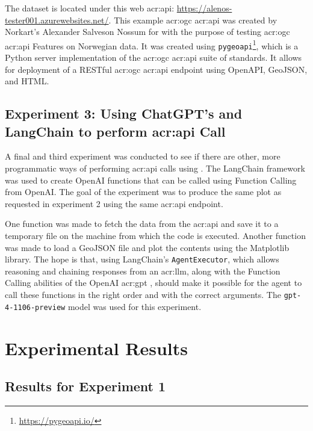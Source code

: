 The dataset is located under this web \acrshort{acr:api}: \url{https://alenos-tester001.azurewebsites.net/}. This example \acrshort{acr:ogc} \acrshort{acr:api} was created by Norkart's Alexander Salveson Nossum for with the purpose of testing \acrshort{acr:ogc} \acrshort{acr:api} Features on Norwegian data. It was created using \texttt{pygeoapi}\footnote{\url{https://pygeoapi.io/}}, which is a Python server implementation of the \acrshort{acr:ogc} \acrshort{acr:api} suite of standards. It allows for deployment of a RESTful \acrshort{acr:ogc} \acrshort{acr:api} endpoint using OpenAPI, GeoJSON, and HTML.

\subsection[Experiment 3: Using ChatGPT's and LangChain to perform API Call]{Experiment 3: Using ChatGPT's and LangChain to perform \acrshort{acr:api} Call}

A final and third experiment was conducted to see if there are other, more programmatic ways of performing \acrshort{acr:api} calls using . The LangChain framework \citep{chaseLangChain2022} was used to create OpenAI functions that can be called using Function Calling from OpenAI. The goal of the experiment was to produce the same plot as requested in experiment 2 using the same \acrshort{acr:api} endpoint.

One function was made to fetch the data from the \acrshort{acr:api} and save it to a temporary file on the machine from which the code is executed. Another function was made to load a GeoJSON file and plot the contents using the Matplotlib library. The hope is that, using LangChain's \texttt{AgentExecutor}, which allows reasoning and chaining responses from an \acrshort{acr:llm}, along with the Function Calling abilities of the OpenAI \acrshort{acr:gpt} , should make it possible for the agent to call these functions in the right order and with the correct arguments. The \texttt{gpt-4-1106-preview} model was used for this experiment.

\section{Experimental Results}\label{sec:experimental-results}

\subsection{Results for Experiment 1}\label{subsec:experiment-1-results}

